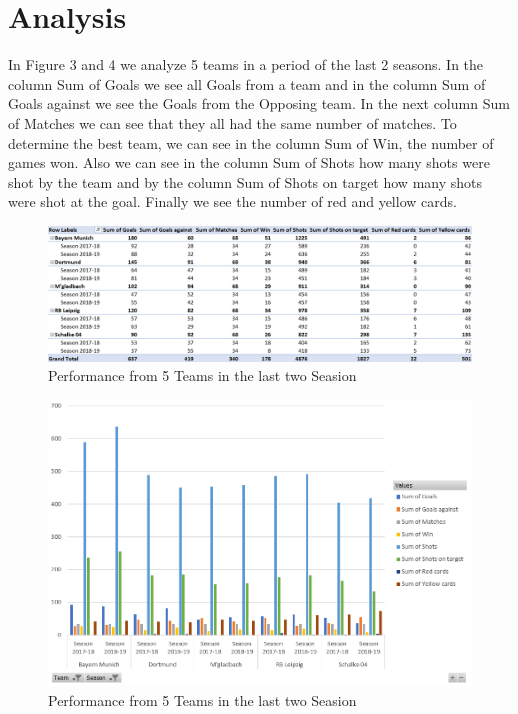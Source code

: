 \documentclass[11pt, journal]{IEEEtran}
\begin{document}
\section{Analysis} \label{sec:analy}
In Figure 3 and 4 we analyze 5 teams in a period of the last 2 seasons. In the column Sum of Goals we see all Goals from a team and in the column Sum of Goals against we see the Goals from the Opposing team. In the next column Sum of Matches we can see that they all had the same number of matches. To determine the best team, we can see in the column Sum of Win, the number of games won. Also we can see in the column Sum of Shots how many shots were shot by the team and by the column Sum of Shots on target how many shots were shot at the goal. Finally we see the number of red and yellow cards.

\begin{figure}[htb]
	\centering
		\includegraphics[width=1.0\columnwidth]{images/Pivot_Performance_Top5-LastSeason_In_Seasons201819-201718}
	\caption{Performance from 5 Teams in the last two Seasion }
	\label{tab:probov}
\end{figure}
\begin{figure}[htb]
	\centering
		\includegraphics[width=1.0\columnwidth]{images/BarGraph_Performance_Top5-LastSeason_In_Seasons201819-201718}
	\caption{Performance from 5 Teams in the last two Seasion }
	\label{fig:probov}
\end{figure}
\end{document}
